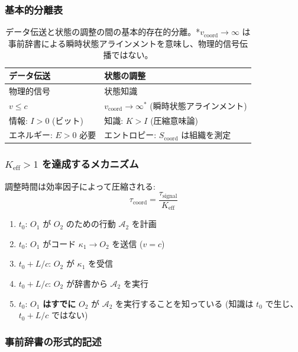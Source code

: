 \documentclass[11pt,a4paper]{article}
\begin{document}
	\subsubsection{基本的分離表}
	\begin{table}[H]
		\centering
		
			\begin{tabular}{|p{0.45\textwidth}|p{}|}
				\hline
				\textbf{データ伝送} & \textbf{状態の調整} \\
				\hline
				物理的信号 & 状態知識 \\
				$v \leq c$ & $v_{\text{coord}} \to \infty^*$ (瞬時状態アラインメント) \\
				情報: $I > 0$ (ビット) & 知識: $K > I$ (圧縮意味論) \\
				エネルギー: $E > 0$ 必要 & エントロピー: $S_{\text{coord}}$ は組織を測定 \\
				\hline
			\end{tabular}
	
		\caption{データ伝送と状態の調整の間の基本的存在的分離。*$v_{\text{coord}} \to \infty$ は事前辞書による瞬時状態アラインメントを意味し、物理的信号伝播ではない。}
		\label{tab:coordination-vs-data}
	\end{table}
	
	\subsubsection{$K_{\mathrm{eff}} > 1$ を達成するメカニズム}
	
	調整時間は効率因子によって圧縮される:
	\begin{equation}
		\tau_{\text{coord}} = \frac{\tau_{\text{signal}}}{K_{\mathrm{eff}}}
	\end{equation}
	
	\begin{enumerate}[label=\arabic*.]
		\item $t_0$: $O_1$ が $O_2$ のための行動 $\mathcal{A}_2$ を計画
		\item $t_0$: $O_1$ がコード $\kappa_1 \to O_2$ を送信 ($v = c$)
		\item $t_0 + L/c$: $O_2$ が $\kappa_1$ を受信
		\item $t_0 + L/c$: $O_2$ が辞書から $\mathcal{A}_2$ を実行
		\item $t_0$: $O_1$ \textbf{はすでに} $O_2$ が $\mathcal{A}_2$ を実行することを知っている (知識は $t_0$ で生じ、$t_0 + L/c$ ではない)
	\end{enumerate}
	
	\subsubsection{事前辞書の形式的記述}
	
\end{document}
